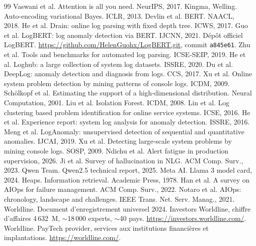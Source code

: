 \documentclass[12pt,a4paper]{report}
\begin{document}
\begin{thebibliography}{99}
 Vaswani et al. Attention is all you need. NeurIPS, 2017.
 Kingma, Welling. Auto-encoding variational Bayes. ICLR, 2013.
 Devlin et al. BERT. NAACL, 2018.
 He et al. Drain: online log parsing with fixed depth tree. ICWS, 2017.
 Guo et al. LogBERT: log anomaly detection via BERT. IJCNN, 2021.
 Dépôt officiel LogBERT. \url{https://github.com/HelenGuohx/LogBERT.git}, commit \texttt{a845e61}.
 Zhu et al. Tools and benchmarks for automated log parsing. ICSE-SEIP, 2019.
 He et al. Loghub: a large collection of system log datasets. ISSRE, 2020.
 Du et al. DeepLog: anomaly detection and diagnosis from logs. CCS, 2017.
 Xu et al. Online system problem detection by mining patterns of console logs. ICDM, 2009.
 Schölkopf et al. Estimating the support of a high-dimensional distribution. Neural Computation, 2001.
 Liu et al. Isolation Forest. ICDM, 2008.
 Lin et al. Log clustering based problem identification for online service systems. ICSE, 2016.
 He et al. Experience report: system log analysis for anomaly detection. ISSRE, 2016.
 Meng et al. LogAnomaly: unsupervised detection of sequential and quantitative anomalies. IJCAI, 2019.
 Xu et al. Detecting large-scale system problems by mining console logs. SOSP, 2009.
 Ndichu et al. Alert fatigue in production supervision, 2026.
 Ji et al. Survey of hallucination in NLG. ACM Comp. Surv., 2023.
 Qwen Team. Qwen2.5 technical report, 2025.
 Meta AI. Llama 3 model card, 2024.
 Heaps. Information retrieval. Academic Press, 1978.
 Han et al. A survey on AIOps for failure management. ACM Comp. Surv., 2022.
 Notaro et al. AIOps: chronology, landscape and challenges. IEEE Trans. Net. Serv. Manag., 2021.
 Worldline. Document d'enregistrement universel 2024. Investors Worldline, chiffre d'affaires 4\,632~M\texteuro, $\sim$18\,000 experts, $\sim$40 pays. \url{https://investors.worldline.com/}.
 Worldline. PayTech provider, services aux institutions financières et implantations. \url{https://worldline.com/}.
\end{thebibliography}
\end{document}
